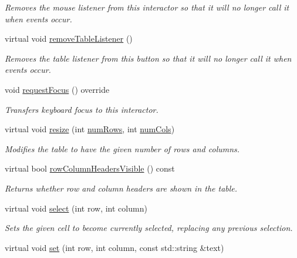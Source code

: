 \begin{DoxyCompactItemize}
\begin{DoxyCompactList}\small\item\em Removes the mouse listener from this interactor so that it will no longer call it when events occur. \end{DoxyCompactList}\item 
virtual void \mbox{\hyperlink{classGTable_a5c18bacaf370f9c3da545f5c6e6e9515}{remove\+Table\+Listener}} ()
\begin{DoxyCompactList}\small\item\em Removes the table listener from this button so that it will no longer call it when events occur. \end{DoxyCompactList}\item 
void \mbox{\hyperlink{classGTable_a5921efd0a5a83eacebdadb749fb3ea7a}{request\+Focus}} () override
\begin{DoxyCompactList}\small\item\em Transfers keyboard focus to this interactor. \end{DoxyCompactList}\item 
virtual void \mbox{\hyperlink{classGTable_a600810b1a74ec9a062ce38666a9e7602}{resize}} (int \mbox{\hyperlink{classGTable_a00b7e69dd5c43e42cc91db26c459ad8b}{num\+Rows}}, int \mbox{\hyperlink{classGTable_a5997e103e56aae1db12e1f7f02e136c5}{num\+Cols}})
\begin{DoxyCompactList}\small\item\em Modifies the table to have the given number of rows and columns. \end{DoxyCompactList}\item 
virtual bool \mbox{\hyperlink{classGTable_a92c3dff0296ec16823a1172a9f9f07e6}{row\+Column\+Headers\+Visible}} () const
\begin{DoxyCompactList}\small\item\em Returns whether row and column headers are shown in the table. \end{DoxyCompactList}\item 
virtual void \mbox{\hyperlink{classGTable_ab06a36d6ed149c8477a1a9d32be2ba43}{select}} (int row, int column)
\begin{DoxyCompactList}\small\item\em Sets the given cell to become currently selected, replacing any previous selection. \end{DoxyCompactList}\item 
virtual void \mbox{\hyperlink{classGTable_ad1a09eece3a11ef4d2c56a951ae06a69}{set}} (int row, int column, const std\+::string \&text)

\end{DoxyCompactItemize}
